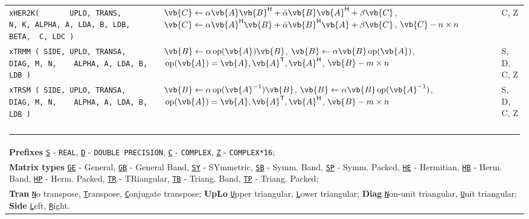 \documentclass[10pt,a3paper, landscape]{article}
\newcommand{\T}{\mathsf{T}}
\renewcommand{\H}{\mathsf{H}}
\renewcommand{\op}{\,\mathrm{op}}
\newcommand{\key}[1]{\underline{\texttt{#1}}}
\begin{document}
\begin{tabular}{lll}
		\verb|xHER2K(       UPLO, TRANS,                  N, K, ALPHA, A, LDA, B, LDB, BETA,  C, LDC ) | & $\vb{C} \gets \alpha \vb{A}    \vb{B}^{\H}      +   \bar{\alpha} \vb{B} \vb{A}^{\H}   + \beta \vb{C} $, $\vb{C} \gets \alpha \vb{A}^{\H}    \vb{B}      +   \bar{\alpha} \vb{B}^{\H} \vb{A}   + \beta \vb{C} $,                        $\vb{C} - n \times n$ & C, Z               \\
		\verb|xTRMM ( SIDE, UPLO, TRANSA,        DIAG, M, N,    ALPHA, A, LDA, B, LDB )                | & $\vb{B} \gets \alpha \op(\vb{A})\vb{B}                                           $, $\vb{B} \gets \alpha \vb{B} \op(\vb{A})                                          $, $\op(\vb{A}) = \vb{A}, \vb{A}^{\T}, \vb{A}^{\H}$, $\vb{B} - m \times n$              & S, D, C, Z         \\
		\verb|xTRSM ( SIDE, UPLO, TRANSA,        DIAG, M, N,    ALPHA, A, LDA, B, LDB )                | & $\vb{B} \gets \alpha \op(\vb{A}^{-1}) \vb{B}                                     $, $\vb{B} \gets \alpha \vb{B} \op(\vb{A}^{-1})                                     $, $\op(\vb{A}) = \vb{A}, \vb{A}^{\T}, \vb{A}^{\H}$, $\vb{B} - m \times n$              & S, D, C, Z         \\
		& & \\
		\multicolumn{3}{l}{\small\rule{2cm}{1pt}}\\
		\multicolumn{3}{l}{\small\textbf{Prefixes}\; \key{S} - \texttt{REAL}, \key{D} - \texttt{DOUBLE PRECISION}, \key{C} - \texttt{COMPLEX}, \key{Z} - \texttt{COMPLEX*16};}\\  
		\multicolumn{3}{l}{\small\textbf{Matrix types}\; \key{GE} - General, \key{GB} - General Band, \key{SY} -  SYmmetric, 
			\key{SB} - Symm. Band, \key{SP} - Symm. Packed, \key{HE} - Hermitian, \key{HB} - Herm. Band, 
			\key{HP} - Herm. Packed, \key{TR} - TRiangular, \key{TB} - Triang. Band, \key{TP} - Triang. Packed;}\\
		\multicolumn{3}{l}{\small
			\textbf{Tran}\; \key{N}o transpose, \key{T}ranspose, \key{C}onjugate transpose;\quad
			\textbf{UpLo}\; \key{U}pper triangular, \key{L}ower triangular;\quad
			\textbf{Diag}\; \key{N}on-unit triangular, \key{U}nit triangular;\quad
			\textbf{Side}\; \key{L}eft, \key{R}ight.
		
		}
	\end{tabular}
		

	
	
	
	
\end{document}
